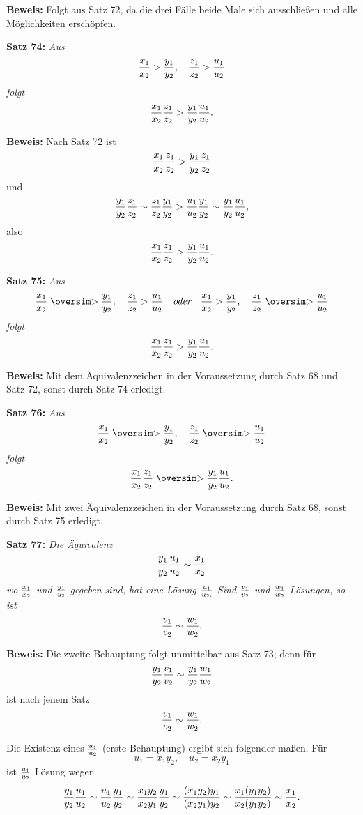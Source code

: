 {\bf Beweis:} Folgt aus Satz 72, da die drei F\"alle beide Male sich
ausschlie{\ss}en und alle M\"oglichkeiten ersch\"opfen.
\medskip


{\bf Satz 74:} {\it Aus
$${x_1 \over x_2} > {y_1 \over y_2},\quad {z_1 \over z_2} > {u_1 \over u_2}$$
folgt
$${x_1 \over x_2}{z_1 \over z_2} > {y_1 \over y_2}{u_1 \over u_2}.$$}%

{\bf Beweis:} Nach Satz 72 ist
$${x_1 \over x_2}{z_1 \over z_2} > {y_1 \over y_2}{z_1 \over z_2}$$
und
$${y_1 \over y_2}{z_1 \over z_2} \sim {z_1 \over z_2}{y_1 \over y_2} > {u_1 \over u_2}{y_1 \over y_2} \sim {y_1 \over y_2}{u_1 \over u_2},$$
also
$${x_1 \over x_2}{z_1 \over z_2} > {y_1 \over y_2}{u_1 \over u_2}.$$
\medskip


{\bf Satz 75:} {\it Aus
$${x_1 \over x_2} \gesim {y_1 \over y_2},\quad {z_1 \over z_2} > {u_1 \over u_2}\quad\hbox{\it oder}\quad{x_1 \over x_2} > {y_1 \over y_2},\quad {z_1 \over z_2} \gesim {u_1 \over u_2}$$
folgt
$${x_1 \over x_2}{z_1 \over z_2} > {y_1 \over y_2}{u_1 \over u_2}.$$}%

{\bf Beweis:} Mit dem \"Aquivalenzzeichen in der Voraussetzung
durch Satz 68 und Satz 72, sonst durch Satz 74 erledigt.
\medskip


{\bf Satz 76:} {\it Aus
$${x_1 \over x_2} \gesim {y_1 \over y_2},\quad {z_1 \over z_2} \gesim {u_1 \over u_2}$$
folgt
$${x_1 \over x_2}{z_1 \over z_2} \gesim {y_1 \over y_2}{u_1 \over u_2}.$$}%

{\bf Beweis:} Mit zwei \"Aquivalenzzeichen in der Voraussetzung
durch Satz 68, sonst durch Satz 75 erledigt.
\medskip


{\bf Satz 77:} {\it Die \"Aquivalenz
$${y_1 \over y_2}{u_1 \over u_2} \sim {x_1 \over x_2}$$
wo $x_1 \over x_2$ und $y_1 \over y_2$ gegeben sind, hat eine L\"osung $u_1 \over u_2.$  Sind $v_1 \over v_2$ und $w_1 \over w_2$
L\"osungen, so ist
$${v_1 \over v_2} \sim {w_1 \over w_2}.$$}%

{\bf Beweis:} Die zweite Behauptung folgt unmittelbar aus Satz
73; denn f\"ur
$${y_1 \over y_2}{v_1 \over v_2} \sim {y_1 \over y_2}{w_1 \over w_2}$$
ist nach jenem Satz
$${v_1 \over v_2} \sim {w_1 \over w_2}.$$

Die Existenz eines $u_1 \over u_2$ (erste Behauptung) ergibt sich folgender%
ma{\ss}en.  F\"ur
$$u_1 = x_1 y_2,\quad u_2 = x_2 y_1$$
ist $u_1 \over u_2$ L\"osung wegen
$${y_1 \over y_2}{u_1 \over u_2} \sim {u_1 \over u_2}{y_1 \over y_2} \sim {x_1 y_2 \over x_2 y_1}{y_1 \over y_2} \sim {(x_1 y_2) y_1 \over (x_2 y_1) y_2} \sim {x_1 (y_1 y_2) \over x_2 (y_1 y_2)} \sim {x_1 \over x_2}.$$
\vfill\eject


